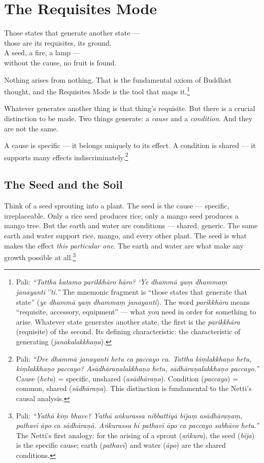 \chapter{The Requisites Mode}
\label{ch:requisites}

\begin{versebox}
Those states that generate another state ---\\
those are its requisites, its ground.\\
A seed, a fire, a lamp ---\\
without the cause, no fruit is found.
\end{versebox}

\noindent Nothing arises from nothing. That is the fundamental axiom of Buddhist thought, and the Requisites Mode is the tool that maps it.\footnote{Pali: \textit{``Tattha katamo parikkhāro hāro? `Ye dhammā yaṃ dhammaṃ janayantī\,''ti.''} The mnemonic fragment is ``those states that generate that state'' (\textit{ye dhammā yaṃ dhammaṃ janayanti}). The word \textit{parikkhāra} means ``requisite, accessory, equipment'' --- what you need in order for something to arise. Whatever state generates another state, the first is the \textit{parikkhāra} (requisite) of the second. Its defining characteristic: the characteristic of generating (\textit{janakalakkhaṇa}).}

Whatever generates another thing is that thing's requisite. But there is a crucial distinction to be made. Two things generate: a \textit{cause} and a \textit{condition}. And they are not the same.

A cause is specific --- it belongs uniquely to its effect. A condition is shared --- it supports many effects indiscriminately.\footnote{Pali: \textit{``Dve dhammā janayanti hetu ca paccayo ca. Tattha kiṃlakkhaṇo hetu, kiṃlakkhaṇo paccayo? Asādhāraṇalakkhaṇo hetu, sādhāraṇalakkhaṇo paccayo.''} Cause (\textit{hetu}) = specific, unshared (\textit{asādhāraṇa}). Condition (\textit{paccaya}) = common, shared (\textit{sādhāraṇa}). This distinction is fundamental to the Netti's causal analysis.}

\section*{The Seed and the Soil}

Think of a seed sprouting into a plant. The seed is the cause --- specific, irreplaceable. Only a rice seed produces rice; only a mango seed produces a mango tree. But the earth and water are conditions --- shared, generic. The same earth and water support rice, mango, and every other plant. The seed is what makes the effect \textit{this particular one}. The earth and water are what make any growth possible at all.\footnote{Pali: \textit{``Yathā kiṃ bhave? Yathā aṅkurassa nibbattiyā bījaṃ asādhāraṇaṃ, pathavī āpo ca sādhāraṇā. Aṅkurassa hi pathavī āpo ca paccayo sabhāvo hetu.''} The Netti's first analogy: for the arising of a sprout (\textit{aṅkura}), the seed (\textit{bīja}) is the specific cause; earth (\textit{pathavī}) and water (\textit{āpo}) are the shared conditions.}

